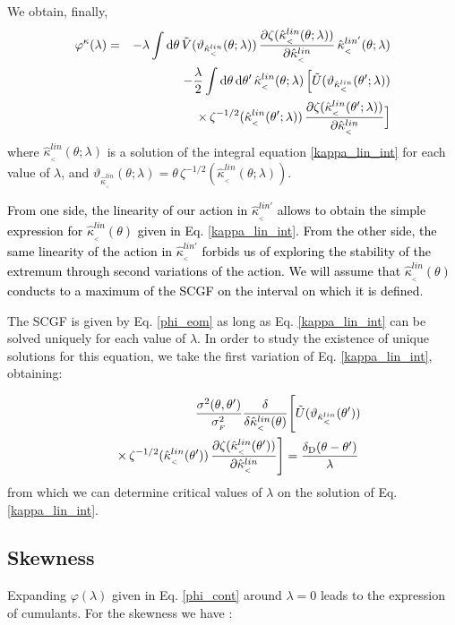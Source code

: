\documentclass[twocolumn,aps,reprint, nofootinbib]{revtex4}
\newcommand{\dd}{{\rm d}}
\newcommand{\Dirac}{\delta_{\rm D}}
\newcommand{\hkappa}{\hat{\kappa}_{_<}}
\newcommand{\tU}{\tilde{U}}
\newcommand{\tV}{\tilde{V}}
\newcommand{\vark}{\vartheta_{\hkappa^{lin}}}
\newcommand{\varphik}{\varphi^{\kappa}}
\newcommand{\pr}[1]{{\textcolor{black}{\textit{} #1}}}
\begin{document}
We obtain, finally, 
\begin{eqnarray}
\label{phi_eom}
\varphik(\lambda) & = & - \lambda \int \dd \theta \, \tV(\vark (\theta; \lambda)) \, \frac{\partial \zeta(\hkappa^{lin} (\theta; \lambda))}{\partial \hkappa^{lin}} \, \hkappa^{lin'}(\theta; \lambda) \nonumber\\ & & - \frac{\lambda}{2} \int \dd \theta \, \dd \theta' \, \hkappa^{lin} (\theta; \lambda) \, \Big[ \tU(\vark (\theta'; \lambda))  \nonumber\\ & & \times \, \zeta^{-1/2} (\hkappa^{lin} (\theta'; \lambda)) \, \frac{\partial \zeta (\hkappa^{lin} (\theta'; \lambda))}{\partial \hkappa^{lin}} \Big]
\end{eqnarray}
where $\hkappa^{lin}(\theta; \lambda)$ is a solution of the integral equation \eqref{kappa_lin_int} for each value of $\lambda$, and $\vark (\theta; \lambda) = \theta \, \zeta^{-1/2}(\hkappa^{lin}(\theta; \lambda))$. 

\pr{From one side, the linearity of our action in $\hkappa^{lin'}$ allows to obtain the simple expression for $\hkappa^{lin} (\theta)$ given in Eq. \eqref{kappa_lin_int}. From the other side, the same linearity of the action in $\hkappa^{lin'}$ forbids us of exploring the stability of the extremum through second variations of the action. We will assume that $\hkappa^{lin} (\theta)$ conducts to a maximum of the SCGF on the interval on which it is defined}.

The SCGF is given by Eq. \eqref{phi_eom} as long as Eq. \eqref{kappa_lin_int} can be solved uniquely for each value of $\lambda$. In order to study the existence of unique solutions for this equation, we take the first variation of Eq. \eqref{kappa_lin_int}, obtaining:

\begin{eqnarray}
\label{critical_det}
& & \frac{\sigma^2(\theta, \theta')}{\sigma_{_F}^2} \frac{\delta}{\delta \hkappa^{lin}(\theta)} \Bigg[ \tU(\vark (\theta')) \nonumber\\ & & \times \, \zeta^{-1/2} (\hkappa^{lin} (\theta')) \,  \frac{\partial \zeta (\hkappa^{lin} (\theta'))}{\partial \hkappa^{lin}} \Bigg] = \frac{\Dirac(\theta - \theta')}{\lambda} \, 
\end{eqnarray}
from which we can determine critical values of $\lambda$ on the solution of Eq. \eqref{kappa_lin_int}.

\subsection{Skewness}
Expanding $\varphi(\lambda)$ given in Eq. \eqref{phi_cont} around $\lambda=0$ leads to the expression of cumulants. For the skewness we have \cite{Bernardeau:2015khs}:
\end{document}
